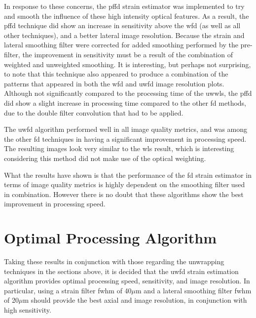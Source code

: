 In response to these concerns, the \ac{pffd} strain estimator was implemented to try and smooth the influence of these high intensity optical features. As a result, the \ac{pffd} technique did show an increase in sensitivity above the \ac{wfd} (as well as all other techniques), and a better lateral image resolution. Because the strain and lateral smoothing filter were corrected for added smoothing performed by the pre-filter, the improvement in sensitivity must be a result of the combination of weighted and unweighted smoothing. It is interesting, but perhaps not surprising, to note that this technique also appeared to produce a combination of the patterns that appeared in both the \ac{wfd} and \ac{uwfd} image resolution plots. Although not significantly compared to the processing time of the \ac{uwwls}, the \ac{pffd} did show a slight increase in processing time compared to the other \ac{fd} methods, due to the double filter convolution that had to be applied.

The \ac{uwfd} algorithm performed well in all image quality metrics, and was among the other \ac{fd} techniques in having a significant improvement in processing speed. The resulting images look very similar to the \ac{wls} result, which is interesting considering this method did not make use of the optical weighting. 

What the results have shown is that the performance of the \ac{fd} strain estimator in terms of image quality metrics is highly dependent on the smoothing filter used in combination. However there is no doubt that these algorithms show the best improvement in processing speed. 

\section{Optimal Processing Algorithm}

Taking these results in conjunction with those regarding the unwrapping techniques in the sections above, it is decided that the \ac{uwfd} strain estimation algorithm provides optimal processing speed, sensitivity, and image resolution. In particular, using a strain filter \ac{fwhm} of 40$\mu$m and a lateral smoothing filter \ac{fwhm} of 20$\mu$m should provide the best axial and image resolution, in conjunction with high sensitivity. 

